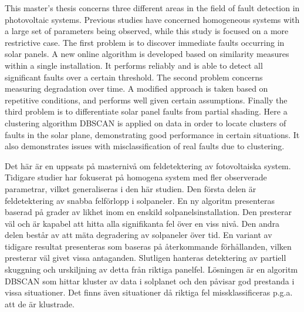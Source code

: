 \newenvironment{abstractpage}
  {\cleardoublepage\vspace*{\fill}\thispagestyle{empty}}
  {\vfill\cleardoublepage}
\newenvironment{polyAbstract}[1]
  {\bigskip\selectlanguage{#1}%
   \begin{center}\bfseries\abstractname\end{center}}
  {\par\bigskip}

\begin{abstractpage}
\begin{polyAbstract}{english}
This master's thesis concerns three different areas in the field of fault detection in photovoltaic systems.
Previous studies have concerned homogeneous systems with a large set of parameters being observed, while this study is focused on a more restrictive case.
The first problem is to discover immediate faults occurring in solar panels.
A new online algorithm is developed based on similarity measures within a single installation.
It performs reliably and is able to detect all significant faults over a certain threshold.
The second problem concerns measuring degradation over time.
A modified approach is taken based on repetitive conditions, and performs well given certain assumptions.
Finally the third problem is to differentiate solar panel faults from partial shading.
Here a clustering algorithm DBSCAN is applied on data in order to locate clusters of faults in the solar plane, demonstrating good performance in certain situations.
It also demonstrates issues with misclassification of real faults due to clustering.

\end{polyAbstract}

\begin{polyAbstract}{swedish}
Det här är en uppsats på masternivå om feldetektering av fotovoltaiska system.
Tidigare studier har fokuserat på homogena system med fler observerade parametrar, vilket generaliseras i den här studien.
Den första delen är feldetektering av snabba felförlopp i solpaneler.
En ny algoritm presenteras baserad på grader av likhet inom en enskild solpanelsinstallation.
Den presterar väl och är kapabel att hitta alla signifikanta fel över en viss nivå.
Den andra delen består av att mäta degradering av solpaneler över tid.
En variant av tidigare resultat presenteras som baseras på återkommande förhållanden, vilken presterar väl givet vissa antaganden.
Slutligen hanteras detektering av partiell skuggning och urskiljning av detta från riktiga panelfel.
Lösningen är en algoritm DBSCAN som hittar kluster av data i solplanet och den påvisar god prestanda i vissa situationer.
Det finns även situationer då riktiga fel missklassificeras p.g.a. att de är klustrade.

\end{polyAbstract}
\end{abstractpage}

